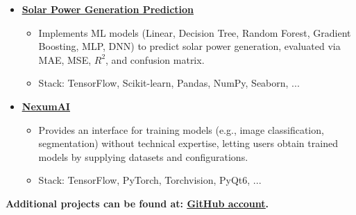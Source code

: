 \documentclass[letter,10pt]{article}
\newcommand{\customsquare}{\raisebox{0.25ex}{\scalebox{0.45}{$\blacksquare$}}}
\begin{document}
\begin{itemize}[label={\customsquare}]
    \item \href{https://github.com/karami-mehdi/SolarPowerGenerationAnalysis}{\underline{\textbf{Solar Power Generation Prediction}}}
    \begin{itemize}
        \item Implements ML models (Linear, Decision Tree, Random Forest, Gradient Boosting, MLP, DNN) to predict solar power generation, evaluated via MAE, MSE, $R^2$, and confusion matrix.
        \item Stack: TensorFlow, Scikit-learn, Pandas, NumPy, Seaborn, ...
    \end{itemize}
    
    \item \href{https://github.com/AINexumLab/NexumAI}{\underline{\textbf{NexumAI}}}
    \begin{itemize}
        \item Provides an interface for training models (e.g., image classification, segmentation) without technical expertise, letting users obtain trained models by supplying datasets and configurations.
        \item Stack: TensorFlow, PyTorch, Torchvision, PyQt6, ...
    \end{itemize}
\end{itemize}

\small \textbf{Additional projects can be found at: \href{https://github.com/karami-mehdi}{\underline{GitHub account}}.}

\end{document}
